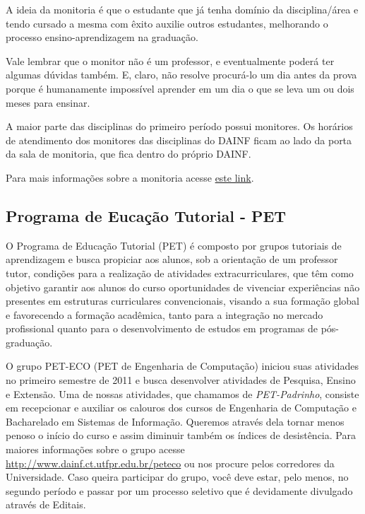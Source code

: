 \documentclass[a4paper,12pt,openany]{article}
\begin{document}
A ideia da monitoria é que o estudante que já tenha domínio da disciplina/área e tendo cursado a mesma com êxito auxilie outros estudantes, melhorando o processo ensino-aprendizagem na graduação. 

Vale lembrar que o monitor não é um professor, e eventualmente poderá ter algumas dúvidas também. E, claro, não resolve procurá-lo um dia antes da prova porque é humanamente impossível aprender em um dia o que se leva um ou dois meses para ensinar.

A maior parte das disciplinas do primeiro período possui monitores. Os horários de atendimento dos monitores das disciplinas do DAINF ficam ao lado da porta da sala de monitoria, que fica dentro do próprio DAINF.

Para mais informações sobre a monitoria acesse \href{http://www.utfpr.edu.br/estrutura-universitaria/pro-reitorias/prograd/programas-academicos/programa-de-monitoria}{este link}.






\subsection{Programa de Eucação Tutorial - PET}

O Programa de Educação Tutorial (PET) é composto por grupos tutoriais de aprendizagem e busca propiciar aos alunos, sob a orientação de um professor tutor, condições para a realização de atividades extracurriculares, que têm como objetivo garantir aos alunos do curso oportunidades de vivenciar experiências não presentes em estruturas curriculares convencionais, visando a sua formação global e favorecendo a formação acadêmica, tanto para a integração no mercado profissional quanto para o desenvolvimento de estudos em programas de pós-graduação.

O grupo PET-ECO (PET de Engenharia de Computação) iniciou suas atividades no primeiro semestre de 2011 e busca desenvolver atividades de Pesquisa, Ensino e Extensão. Uma de nossas atividades, que chamamos de \textit{PET-Padrinho}, consiste em recepcionar e auxiliar os calouros dos cursos de Engenharia de Computação e Bacharelado em Sistemas de Informação. Queremos através dela tornar menos penoso o início do curso e assim diminuir também os índices de desistência. Para maiores informações sobre o grupo acesse \href{http://www.dainf.ct.utfpr.edu.br/peteco}{http://www.dainf.ct.utfpr.edu.br/peteco} ou nos procure pelos corredores da Universidade. Caso queira participar do grupo, você deve estar, pelo menos, no segundo período e passar por um processo seletivo que é devidamente divulgado através de Editais.
\end{document}
